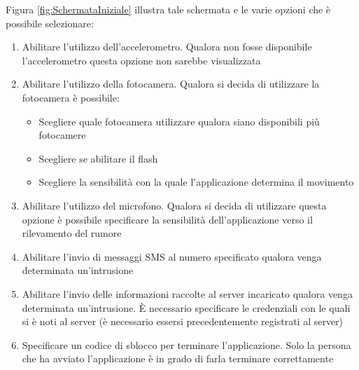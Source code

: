 \noindent Figura \ref{fig:SchermataIniziale} illustra tale schermata e le varie opzioni che è possibile selezionare:
\begin{enumerate}
  \item Abilitare l'utilizzo dell'accelerometro. Qualora non fosse disponibile l'accelerometro questa opzione non sarebbe visualizzata
  \item Abilitare l'utilizzo della fotocamera. Qualora si decida di utilizzare la fotocamera è possibile:
  \begin{itemize}
    \item Scegliere quale fotocamera utilizzare qualora siano disponibili più fotocamere
    \item Scegliere se abilitare il flash
    \item Scegliere la sensibilità con la quale l'applicazione determina il movimento
  \end{itemize}
  \item Abilitare l'utilizzo del microfono. Qualora si decida di utilizzare questa opzione è possibile specificare la sensibilità dell'applicazione verso il rilevamento del rumore
  \item Abilitare l'invio di messaggi SMS al numero specificato qualora venga determinata un'intrusione
  \item Abilitare l'invio delle informazioni raccolte al server incaricato qualora venga determinata un'intrusione. \`E necessario specificare le credenziali con le quali si è noti al server (è necessario essersi precedentemente registrati al server)
  \item Specificare un codice di sblocco per terminare l'applicazione. Solo la persona che ha avviato l'applicazione è in grado di farla terminare correttamente
\end{enumerate}

